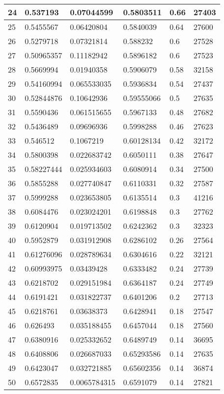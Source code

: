 \begin{longtable}{|l|l|l|l|l|l|}
24 & 0.537193 & 0.07044599 & 0.5803511 & 0.66 & 27403 \\ \hline 
25 & 0.5455567 & 0.06420804 & 0.5840039 & 0.64 & 27600 \\ \hline 
26 & 0.5279718 & 0.07321814 & 0.588232 & 0.6 & 27528 \\ \hline 
27 & 0.50965357 & 0.11182942 & 0.5896182 & 0.6 & 27523 \\ \hline 
28 & 0.5669994 & 0.01940358 & 0.5906079 & 0.58 & 32158 \\ \hline 
29 & 0.54160994 & 0.065533035 & 0.5936834 & 0.54 & 27437 \\ \hline 
30 & 0.52844876 & 0.10642936 & 0.59555066 & 0.5 & 27635 \\ \hline 
31 & 0.5590436 & 0.061515655 & 0.5967133 & 0.48 & 27682 \\ \hline 
32 & 0.5436489 & 0.09696936 & 0.5998288 & 0.46 & 27623 \\ \hline 
33 & 0.546512 & 0.1067219 & 0.60128134 & 0.42 & 32172 \\ \hline 
34 & 0.5800398 & 0.022683742 & 0.6050111 & 0.38 & 27647 \\ \hline 
35 & 0.58227444 & 0.025934603 & 0.6080914 & 0.34 & 27500 \\ \hline 
36 & 0.5855288 & 0.027740847 & 0.6110331 & 0.32 & 27587 \\ \hline 
37 & 0.5999288 & 0.023653805 & 0.6135514 & 0.3 & 41216 \\ \hline 
38 & 0.6084476 & 0.023024201 & 0.6198848 & 0.3 & 27762 \\ \hline 
39 & 0.6120904 & 0.019713502 & 0.6242362 & 0.3 & 32323 \\ \hline 
40 & 0.5952879 & 0.031912908 & 0.6286102 & 0.26 & 27564 \\ \hline 
41 & 0.61276096 & 0.028789634 & 0.6304616 & 0.22 & 32121 \\ \hline 
42 & 0.60993975 & 0.03439428 & 0.6333482 & 0.24 & 27739 \\ \hline 
43 & 0.6218702 & 0.029151984 & 0.6364187 & 0.24 & 27749 \\ \hline 
44 & 0.6191421 & 0.031822737 & 0.6401206 & 0.2 & 27713 \\ \hline 
45 & 0.6218761 & 0.03638373 & 0.6428941 & 0.18 & 27547 \\ \hline 
46 & 0.626493 & 0.035188455 & 0.6457044 & 0.18 & 27560 \\ \hline 
47 & 0.6380916 & 0.025332652 & 0.6489749 & 0.14 & 36695 \\ \hline 
48 & 0.6408806 & 0.026687033 & 0.65293586 & 0.14 & 27635 \\ \hline 
49 & 0.6423047 & 0.032721885 & 0.65602356 & 0.14 & 36874 \\ \hline 
50 & 0.6572835 & 0.0065784315 & 0.6591079 & 0.14 & 27821 \\ \hline 
\end{longtable}